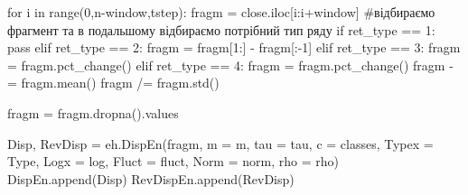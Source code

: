 \documentclass[
  letterpaper,
]{report}
\newenvironment{Shaded}{\begin{snugshade}}{\end{snugshade}}
\newcommand{\BuiltInTok}[1]{\textcolor[rgb]{0.00,0.23,0.31}{#1}}
\newcommand{\CommentTok}[1]{\textcolor[rgb]{0.37,0.37,0.37}{#1}}
\newcommand{\ControlFlowTok}[1]{\textcolor[rgb]{0.00,0.23,0.31}{#1}}
\newcommand{\DecValTok}[1]{\textcolor[rgb]{0.68,0.00,0.00}{#1}}
\newcommand{\KeywordTok}[1]{\textcolor[rgb]{0.00,0.23,0.31}{#1}}
\newcommand{\NormalTok}[1]{\textcolor[rgb]{0.00,0.23,0.31}{#1}}
\newcommand{\OperatorTok}[1]{\textcolor[rgb]{0.37,0.37,0.37}{#1}}
\begin{document}
\begin{Shaded}
\begin{Highlighting}[]
\ControlFlowTok{for}\NormalTok{ i }\KeywordTok{in} \BuiltInTok{range}\NormalTok{(}\DecValTok{0}\NormalTok{,n}\OperatorTok{{-}}\NormalTok{window,tstep):}
\NormalTok{    fragm }\OperatorTok{=}\NormalTok{ close.iloc[i:i}\OperatorTok{+}\NormalTok{window] }\CommentTok{\#відбираємо фрагмент та в подальшому відбираємо потрібний тип ряду}
    \ControlFlowTok{if}\NormalTok{ ret\_type }\OperatorTok{==} \DecValTok{1}\NormalTok{:}
        \ControlFlowTok{pass}
    \ControlFlowTok{elif}\NormalTok{ ret\_type }\OperatorTok{==} \DecValTok{2}\NormalTok{:}
\NormalTok{        fragm }\OperatorTok{=}\NormalTok{ fragm[}\DecValTok{1}\NormalTok{:] }\OperatorTok{{-}}\NormalTok{ fragm[:}\OperatorTok{{-}}\DecValTok{1}\NormalTok{]}
    \ControlFlowTok{elif}\NormalTok{ ret\_type }\OperatorTok{==} \DecValTok{3}\NormalTok{:}
\NormalTok{        fragm }\OperatorTok{=}\NormalTok{ fragm.pct\_change()}
    \ControlFlowTok{elif}\NormalTok{ ret\_type }\OperatorTok{==} \DecValTok{4}\NormalTok{:}
\NormalTok{        fragm }\OperatorTok{=}\NormalTok{ fragm.pct\_change()}
\NormalTok{        fragm }\OperatorTok{{-}=}\NormalTok{ fragm.mean()}
\NormalTok{        fragm }\OperatorTok{/=}\NormalTok{ fragm.std()}
        
\NormalTok{    fragm }\OperatorTok{=}\NormalTok{ fragm.dropna().values}
    
\NormalTok{    Disp, RevDisp }\OperatorTok{=}\NormalTok{ eh.DispEn(fragm, m }\OperatorTok{=}\NormalTok{ m, tau }\OperatorTok{=}\NormalTok{ tau, c }\OperatorTok{=}\NormalTok{ classes, Typex }\OperatorTok{=}\NormalTok{ Type, }
\NormalTok{                              Logx }\OperatorTok{=}\NormalTok{ log, Fluct }\OperatorTok{=}\NormalTok{ fluct, Norm }\OperatorTok{=}\NormalTok{ norm, rho }\OperatorTok{=}\NormalTok{ rho)}
\NormalTok{    DispEn.append(Disp)}
\NormalTok{    RevDispEn.append(RevDisp)}
\end{Highlighting}
\end{Shaded}
\end{document}
